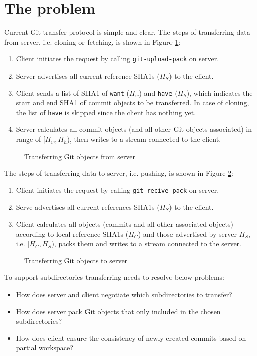 \documentclass[preprint]{sigplanconf}
\begin{document}
\section{The problem}
Current Git transfer protocol is simple and clear.
The steps of transferring data from server, i.e. cloning or fetching, is shown in Figure \ref{fig:git-proto-clone-seq}:

\begin{enumerate}
  \item Client initiates the request by calling \verb|git-upload-pack| on server.
  \item Server advertises all current reference SHA1s ($H_S$) to the client.
  \item Client sends a list of SHA1 of \verb|want| ($H_w$) and \verb|have| ($H_h$), which indicates the start and end SHA1 of commit objects to be transferred.
    In case of cloning, the list of \verb|have| is skipped since the client has nothing yet.
  \item Server calculates all commit objects (and all other Git objects associated) in range of $[H_w, H_h)$, then writes to a stream connected to the client.
\end{enumerate}

\begin{figure}
  \centering
  
  \caption{Transferring Git objects from server}
  \label{fig:git-proto-clone-seq}
\end{figure}
The steps of transferring data to server, i.e. pushing, is shown in Figure \ref{fig:git-proto-push-seq}:
\begin{enumerate}
  \item Client initiates the request by calling \verb|git-recive-pack| on server.
  \item Serve advertises all current references SHA1s ($H_S$) to the client.
  \item Client calculates all objects (commits and all other associated objects) according to local reference SHA1s ($H_C$) and those advertised by server $H_S$, i.e. $[H_C, H_S)$, packs them and writes to a stream connected to the server.
\end{enumerate}


\begin{figure}
  \centering
  
  \caption{Transferring Git objects to server}
  \label{fig:git-proto-push-seq}
\end{figure}

To support subdirectories transferring needs to resolve below problems:
\begin{itemize}
  \item How does server and client negotiate which subdirectories to transfer?
  \item How does server pack Git objects that only included in the chosen subdirectories?
  \item How does client ensure the consistency of newly created commits based on partial workspace?
\end{itemize}
\end{document}
